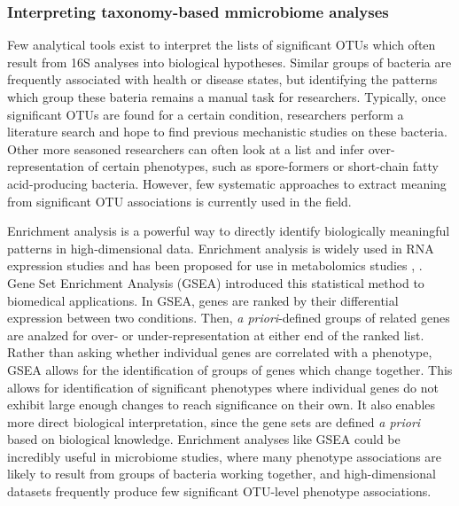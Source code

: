\documentclass[12pt]{article}
\begin{document}
\subsubsection{Interpreting taxonomy-based mmicrobiome analyses}\label{sec:gsea}
Few analytical tools exist to interpret the lists of
significant OTUs which often result from 16S analyses into biological hypotheses. 
Similar groups of bacteria are frequently associated with health or 
disease states, but identifying the patterns which group these bateria 
remains a manual task for researchers. 
Typically, once significant OTUs are found for a certain condition,
researchers perform a literature search and hope to find 
previous mechanistic studies on these bacteria.
Other more seasoned researchers can often look at a list and infer
over-representation of certain phenotypes, such as spore-formers
or short-chain fatty acid-producing bacteria. However,
few systematic approaches to extract meaning from significant
OTU associations is currently used in the field.

Enrichment analysis is a powerful way to directly identify biologically 
meaningful patterns in high-dimensional data. Enrichment analysis is 
widely used in RNA expression studies and has been proposed for use in 
metabolomics studies \cite{subramanian-gsea-2005}, 
\cite{xia-msea-2010}. Gene Set Enrichment Analysis (GSEA) introduced
this statistical method to biomedical applications. In GSEA, genes are 
ranked by their differential expression between two conditions. Then, 
\textit{a priori}-defined groups of related genes are analzed for 
over- or under-representation at either end of the ranked list. Rather 
than asking whether individual genes are correlated with a phenotype, 
GSEA allows for the identification of groups of genes which change 
together. This allows for identification of significant phenotypes 
where individual genes do not exhibit large enough changes to reach 
significance on their own. It also enables more direct biological 
interpretation, since the gene sets are defined \textit{a priori} 
based on biological knowledge. Enrichment analyses like GSEA
could be incredibly useful in microbiome studies, where 
many phenotype associations are likely to result from groups of
bacteria working together, and high-dimensional datasets
frequently produce few significant OTU-level phenotype associations.
\end{document}

